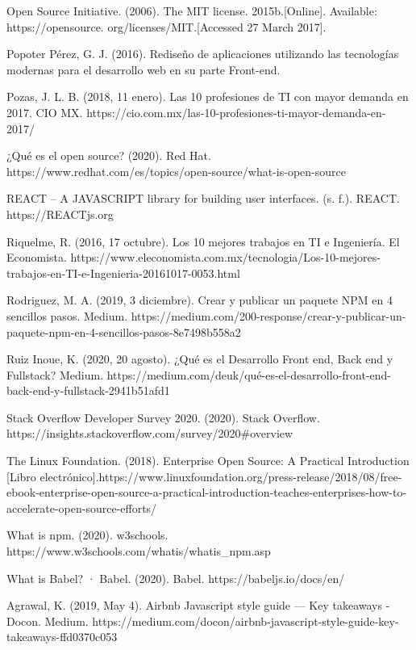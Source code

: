\begin{thebibliography}{100}
\bibitem{} Open Source Initiative. (2006). The MIT license. 2015b.[Online]. Available: https://opensource. org/licenses/MIT.[Accessed 27 March 2017].


 Popoter Pérez, G. J. (2016). Rediseño de aplicaciones utilizando las tecnologías modernas para el desarrollo web en su parte Front-end.


\bibitem{} Pozas, J. L. B. (2018, 11 enero). Las 10 profesiones de TI con mayor demanda en 2017. CIO MX. https://cio.com.mx/las-10-profesiones-ti-mayor-demanda-en-2017/

\bibitem{} ¿Qué es el open source? (2020). Red Hat. https://www.redhat.com/es/topics/open-source/what-is-open-source

 REACT – A JAVASCRIPT library for building user interfaces. (s. f.). REACT. https://REACTjs.org

 Riquelme, R. (2016, 17 octubre). Los 10 mejores trabajos en TI e Ingeniería. El Economista. https://www.eleconomista.com.mx/tecnologia/Los-10-mejores-trabajos-en-TI-e-Ingenieria-20161017-0053.html

 Rodriguez, M. A. (2019, 3 diciembre). Crear y publicar un paquete NPM en 4 sencillos pasos. Medium. https://medium.com/200-response/crear-y-publicar-un-paquete-npm-en-4-sencillos-pasos-8e7498b558a2

 Ruiz Inoue, K. (2020, 20 agosto). ¿Qué es el Desarrollo Front end, Back end y Fullstack? Medium. https://medium.com/deuk/qué-es-el-desarrollo-front-end-back-end-y-fullstack-2941b51afd1

 Stack Overflow Developer Survey 2020. (2020). Stack Overflow. https://insights.stackoverflow.com/survey/2020#overview

 The Linux Foundation. (2018). Enterprise Open Source: A Practical Introduction [Libro electrónico].https://www.linuxfoundation.org/press-release/2018/08/free-ebook-enterprise-open-source-a-practical-introduction-teaches-enterprises-how-to-accelerate-open-source-efforts/

 What is npm. (2020). w3schools. https://www.w3schools.com/whatis/whatis_npm.asp

 What is Babel? · Babel. (2020). Babel. https://babeljs.io/docs/en/

 Agrawal, K. (2019, May 4). Airbnb Javascript style guide — Key takeaways - Docon. Medium. https://medium.com/docon/airbnb-javascript-style-guide-key-takeaways-ffd0370c053



\end{thebibliography}